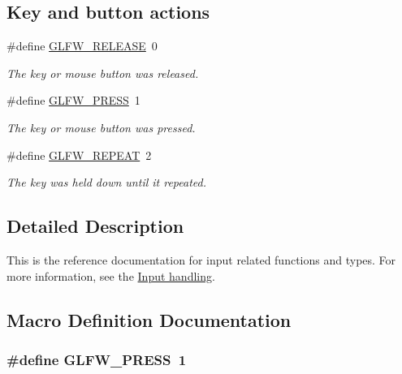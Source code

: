 \subsection*{Key and button actions}
\begin{DoxyCompactItemize}
\item 
\#define \hyperlink{group__input_gada11d965c4da13090ad336e030e4d11f}{G\+L\+F\+W\+\_\+\+R\+E\+L\+E\+A\+S\+E}~0
\begin{DoxyCompactList}\small\item\em The key or mouse button was released. \end{DoxyCompactList}\item 
\#define \hyperlink{group__input_ga2485743d0b59df3791c45951c4195265}{G\+L\+F\+W\+\_\+\+P\+R\+E\+S\+S}~1
\begin{DoxyCompactList}\small\item\em The key or mouse button was pressed. \end{DoxyCompactList}\item 
\#define \hyperlink{group__input_gac96fd3b9fc66c6f0eebaf6532595338f}{G\+L\+F\+W\+\_\+\+R\+E\+P\+E\+A\+T}~2
\begin{DoxyCompactList}\small\item\em The key was held down until it repeated. \end{DoxyCompactList}\end{DoxyCompactItemize}


\subsection{Detailed Description}
This is the reference documentation for input related functions and types. For more information, see the \hyperlink{group__input}{Input handling}. 

\subsection{Macro Definition Documentation}
\hypertarget{group__input_ga2485743d0b59df3791c45951c4195265}{}
\subsubsection[{G\+L\+F\+W\+\_\+\+P\+R\+E\+S\+S}]{\setlength{\rightskip}{0pt plus 5cm}\#define G\+L\+F\+W\+\_\+\+P\+R\+E\+S\+S~1}\label{group__input_ga2485743d0b59df3791c45951c4195265}


